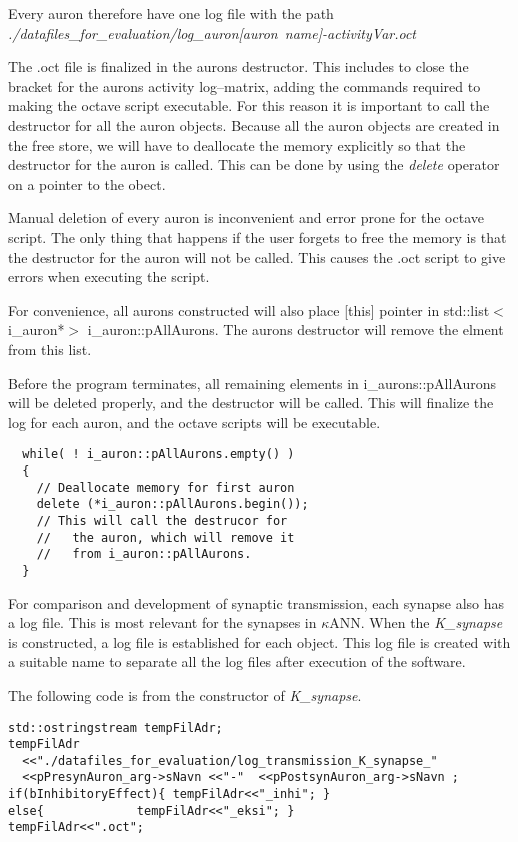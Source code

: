 Every auron therefore have one log file with the path \\ \mbox{\emph{./datafiles\_for\_evaluation/log\_auron[auron name]-activityVar.oct }}

The .oct file is finalized in the aurons destructor. This includes to close the bracket for the aurons activity log--matrix, adding the commands required to making the octave script executable.
For this reason it is important to call the destructor for all the auron objects. 
Because all the auron objects are created in the free store, we will have to deallocate the memory explicitly so that the destructor for the auron is called. 
This can be done by using the \emph{delete} operator on a pointer to the obect.

Manual deletion of every auron is inconvenient and error prone for the octave script. The only thing that happens if the user forgets to free the memory is that the destructor for the auron will not be called. 
This causes the .oct script to give errors when executing the script.

For convenience, all aurons constructed will also place [this] pointer in std::list$<$i\_auron*$>$ i\_auron::pAllAurons.
The aurons destructor will remove the elment from this list.

Before the program terminates, all remaining elements in i\_aurons::pAllAurons will be deleted properly, and the destructor will be called.
This will finalize the log for each auron, and the octave scripts will be executable.

\begin{lstlisting}
  while( ! i_auron::pAllAurons.empty() ) 
  { 
    // Deallocate memory for first auron
    delete (*i_auron::pAllAurons.begin()); 
    // This will call the destrucor for
    //   the auron, which will remove it
    //   from i_auron::pAllAurons.
  }   
\end{lstlisting}

For comparison and development of synaptic transmission, each synapse also has a log file. This is most relevant for the synapses in $\kappa$ANN.
When the \emph{K\_synapse} is constructed, a log file is established for each object. This log file is created with a suitable name to separate all the log files after execution of the software.

The following code is from the constructor of \emph{K\_synapse}.
\begin{lstlisting}
std::ostringstream tempFilAdr;
tempFilAdr
  <<"./datafiles_for_evaluation/log_transmission_K_synapse_" 
  <<pPresynAuron_arg->sNavn <<"-"  <<pPostsynAuron_arg->sNavn ;
if(bInhibitoryEffect){ tempFilAdr<<"_inhi"; }
else{ 			  tempFilAdr<<"_eksi"; }
tempFilAdr<<".oct";
\end{lstlisting}

